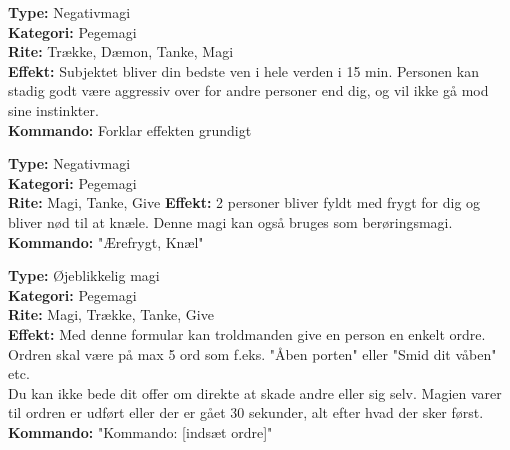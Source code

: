 \begin{kontrol*}[Venskab]
\textbf{Type:} Negativmagi\\
\textbf{Kategori:} Pegemagi\\
\textbf{Rite:} Trække, Dæmon, Tanke, Magi\\
\textbf{Effekt:} Subjektet bliver din bedste ven i hele verden i 15 min. Personen kan stadig godt være aggressiv over for andre personer end dig, og vil ikke gå mod sine instinkter.\\
\textbf{Kommando:} Forklar effekten grundigt
\end{kontrol*}

\begin{kontrol*}[Ærefrygt]
\textbf{Type:} Negativmagi\\
\textbf{Kategori:} Pegemagi\\  
\textbf{Rite:} Magi, Tanke, Give
\textbf{Effekt:} 2 personer bliver fyldt med frygt for dig og bliver nød til at knæle. Denne magi kan også bruges som berøringsmagi.\\
\textbf{Kommando:} "Ærefrygt, Knæl"
\end{kontrol*}

\begin{kontrol*}[Kommando]
\textbf{Type:} Øjeblikkelig magi\\
\textbf{Kategori:} Pegemagi\\
\textbf{Rite:} Magi, Trække, Tanke, Give\\
\textbf{Effekt:} Med denne formular kan troldmanden give en person en enkelt ordre. Ordren skal være på max 5 ord som f.eks. "Åben porten" eller "Smid dit våben" etc. \\
Du kan ikke bede dit offer om direkte at skade andre eller sig selv. Magien varer til ordren er udført eller der er gået 30 sekunder, alt efter hvad der
sker først.\\
\textbf{Kommando:} "Kommando: [indsæt ordre]"
\end{kontrol*}